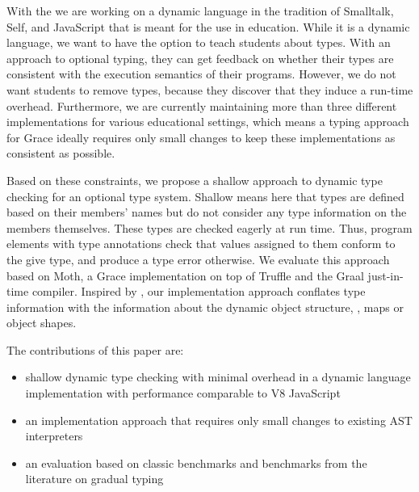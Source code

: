 
With the 
we are working on a dynamic language in the tradition of
Smalltalk\citep{Smalltalk80}, Self\citep{Self}, and JavaScript
that is meant for the use in education.
While it is a dynamic language,
we want to have the option to teach students about types.
With an approach to optional typing,
they can get feedback on whether their types are consistent
with the execution semantics of their programs.
However, we do not want students to remove types,
because they discover that they induce a run-time overhead.
Furthermore, we are currently maintaining more than three different implementations
for various educational settings,
which means a typing approach for Grace ideally requires only small changes
to keep these implementations as consistent as possible.

Based on these constraints,
we propose a shallow approach to dynamic type checking
for an optional type system.
Shallow means here that types are defined based on their members' names
but do not consider any type information on the members themselves.
These types are checked eagerly at run time.
Thus, program elements with type annotations check
that values assigned to them conform to the give type,
and produce a type error otherwise.
We evaluate this approach based on Moth,
a Grace implementation on top of Truffle
and the Graal just-in-time compiler\citep{Wurthinger2013,Wurthinger:2017:PPE}.
Inspired by \citet{Richards2017,Bauman2017},
our implementation approach conflates type information
with the information about the dynamic object structure,
\ie, maps\citep{Self} or object shapes\citep{woss2014object}.



The contributions of this paper are:

\begin{itemize}
\item shallow dynamic type checking with minimal overhead
      in a dynamic language implementation
      with performance comparable to V8 JavaScript
\item an implementation approach that requires
      only small changes to existing AST interpreters
\item an evaluation based on classic benchmarks
      and benchmarks from the literature on gradual typing
\end{itemize}

